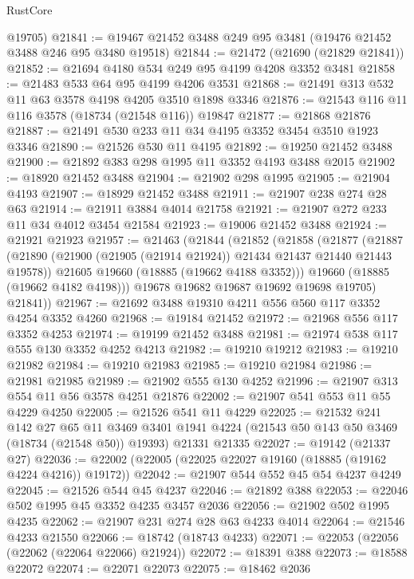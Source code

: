 \begin{lexlean}{RustCore}
\begin{coremodule}
      @19705)
@21841 := @19467 @21452 @3488 @249 @95 @3481 (@19476 @21452 @3488 @246 @95 @3480 @19518)
@21844 := @21472 (@21690 (@21829 @21841))
@21852 := @21694 @4180 @534 @249 @95 @4199 @4208 @3352 @3481
@21858 := @21483 @533 @64 @95 @4199 @4206 @3531
@21868 := @21491 @313 @532 @11 @63 @3578 @4198 @4205 @3510 @1898 @3346
@21876 := @21543 @116 @11 @116 @3578 (@18734 (@21548 @116)) @19847
@21877 := @21868 @21876
@21887 := @21491 @530 @233 @11 @34 @4195 @3352 @3454 @3510 @1923 @3346
@21890 := @21526 @530 @11 @4195
@21892 := @19250 @21452 @3488
@21900 := @21892 @383 @298 @1995 @11 @3352 @4193 @3488 @2015
@21902 := @18920 @21452 @3488
@21904 := @21902 @298 @1995
@21905 := @21904 @4193
@21907 := @18929 @21452 @3488
@21911 := @21907 @238 @274 @28 @63
@21914 := @21911 @3884 @4014 @21758
@21921 := @21907 @272 @233 @11 @34 @4012 @3454 @21584
@21923 := @19006 @21452 @3488
@21924 := @21921 @21923
@21957 := @21463
    (@21844
      (@21852
        (@21858
          (@21877
            (@21887
              (@21890 (@21900 (@21905 (@21914 @21924)) @21434 @21437 @21440 @21443 @19578))
              @21605
              @19660
              (@18885 (@19662 @4188 @3352)))
            @19660
            (@18885 (@19662 @4182 @4198)))
          @19678
          @19682
          @19687
          @19692
          @19698
          @19705)
        @21841))
@21967 := @21692 @3488 @19310 @4211 @556 @560 @117 @3352 @4254 @3352 @4260
@21968 := @19184 @21452
@21972 := @21968 @556 @117 @3352 @4253
@21974 := @19199 @21452 @3488
@21981 := @21974 @538 @117 @555 @130 @3352 @4252 @4213
@21982 := @19210 @19212
@21983 := @19210 @21982
@21984 := @19210 @21983
@21985 := @19210 @21984
@21986 := @21981 @21985
@21989 := @21902 @555 @130 @4252
@21996 := @21907 @313 @554 @11 @56 @3578 @4251 @21876
@22002 := @21907 @541 @553 @11 @55 @4229 @4250
@22005 := @21526 @541 @11 @4229
@22025 := @21532
    @241
    @142
    @27
    @65
    @11
    @3469
    @3401
    @1941
    @4224
    (@21543 @50 @143 @50 @3469 (@18734 (@21548 @50)) @19393)
    @21331
    @21335
@22027 := @19142 (@21337 @27)
@22036 := @22002 (@22005 (@22025 @22027 @19160 (@18885 (@19162 @4224 @4216)) @19172))
@22042 := @21907 @544 @552 @45 @54 @4237 @4249
@22045 := @21526 @544 @45 @4237
@22046 := @21892 @388
@22053 := @22046 @502 @1995 @45 @3352 @4235 @3457 @2036
@22056 := @21902 @502 @1995 @4235
@22062 := @21907 @231 @274 @28 @63 @4233 @4014
@22064 := @21546 @4233 @21550
@22066 := @18742 (@18743 @4233)
@22071 := @22053 (@22056 (@22062 (@22064 @22066) @21924))
@22072 := @18391 @388
@22073 := @18588 @22072
@22074 := @22071 @22073
@22075 := @18462 @2036

\end{coremodule}
\end{lexlean}
